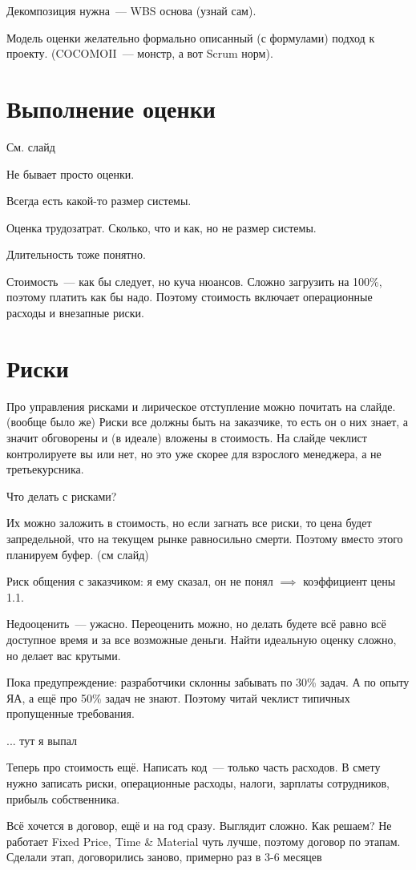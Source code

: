 \documentclass[12pt, a4paper, oneside]{memoir}
\begin{document}
Декомпозиция нужна~--- WBS основа (узнай сам).

Модель оценки желательно формально описанный (с формулами) подход к проекту.
(COCOMOII~--- монстр, а вот Scrum норм).

\section*{Выполнение оценки}
См. слайд

Не бывает просто оценки.

Всегда есть какой-то размер системы.

Оценка трудозатрат.
Сколько, что и как, но не размер системы.

Длительность тоже понятно.

Стоимость~--- как бы следует, но куча нюансов.
Сложно загрузить на 100\%, поэтому платить как бы надо.
Поэтому стоимость включает операционные расходы и внезапные риски.

\section*{Риски}
Про управления рисками и лирическое отступление можно почитать на слайде.
(вообще было же)
Риски все должны быть на заказчике, то есть он о них знает, а значит обговорены и (в идеале) вложены в стоимость.
На слайде чеклист контролируете вы или нет, но это уже скорее для взрослого менеджера, а не третьекурсника.

Что делать с рисками?

Их можно заложить в стоимость, но если загнать все риски, то цена будет запредельной, что на текущем рынке равносильно смерти.
Поэтому вместо этого планируем буфер. (см слайд)

Риск общения с заказчиком: я ему сказал, он не понял $\implies$ коэффициент цены 1.1.

Недооценить~--- ужасно.
Переоценить можно, но делать будете всё равно всё доступное время и за все возможные деньги.
Найти идеальную оценку сложно, но делает вас крутыми.

Пока предупреждение: разработчики склонны забывать по 30\% задач.
А по опыту ЯА, а ещё про 50\% задач не знают.
Поэтому читай чеклист типичных пропущенные требования.

... тут я выпал

Теперь про стоимость ещё.
Написать код~--- только часть расходов.
В смету нужно записать риски, операционные расходы, налоги, зарплаты сотрудников, прибыль собственника.

Всё хочется в договор, ещё и на год сразу.
Выглядит сложно.
Как решаем?
Не работает Fixed Price, Time \& Material чуть лучше, поэтому договор по этапам.
Сделали этап, договорились заново, примерно раз в 3-6 месяцев
\end{document}
